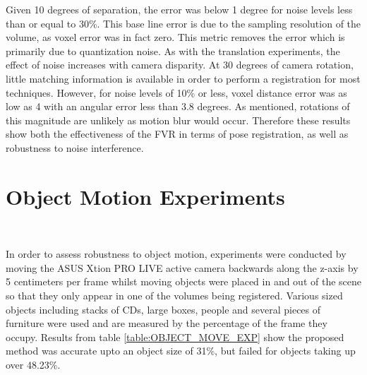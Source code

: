 Given 10 degrees of separation, the error was below 1 degree for noise levels less than or equal to 30\%. This base line error is due to the sampling resolution of the volume, as voxel error was in fact zero. This metric removes the error which is primarily due to quantization noise. As with the translation experiments, the effect of noise increases with camera disparity. At 30 degrees of camera rotation, little matching information is available in order to perform a registration for most techniques. However, for noise levels of 10\% or less, voxel distance error was as low as 4 with an angular error less than $3.8$ degrees. As mentioned, rotations of this magnitude are unlikely as motion blur would occur. Therefore these results show both the effectiveness of the FVR in terms of pose registration, as well as robustness to noise interference. \\


\section{Object Motion Experiments}
\label{Sec:FVRMotionExp}

\begin{table}[!htb]
\centering
{}
\\
\caption{Object Motion Test}
\label{table:OBJECT_MOVE_EXP}
\end{table}


In order to assess robustness to object motion, experiments were conducted by moving the ASUS Xtion PRO LIVE active camera backwards along the z-axis by 5 centimeters per frame whilst moving objects were placed in and out of the scene so that they only appear in one of the volumes being registered. Various sized objects including stacks of CDs, large boxes, people and several pieces of furniture were used and are measured by the percentage of the frame they occupy. Results from table \ref{table:OBJECT_MOVE_EXP} show the proposed method was accurate upto an object size of 31\%, but failed for objects taking up over 48.23\%.

